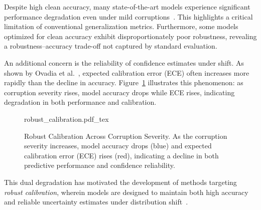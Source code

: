 Despite high clean accuracy, many state-of-the-art models experience significant performance degradation even under mild corruptions~\cite{hendrycks2019benchmarking}. This highlights a critical limitation of conventional generalization metrics. Furthermore, some models optimized for clean accuracy exhibit disproportionately poor robustness, revealing a robustness–accuracy trade-off not captured by standard evaluation.

An additional concern is the reliability of confidence estimates under shift. As shown by Ovadia et al.~\cite{ovadia2019can}, expected calibration error (ECE) often increases more rapidly than the decline in accuracy. Figure~\ref{fig:robust_calibration} illustrates this phenomenon: as corruption severity rises, model accuracy drops while ECE rises, indicating degradation in both performance and calibration.

\begin{figure}[h!]
	\centering
        \def\svgwidth{300pt}
 	{robust_calibration.pdf_tex} 	  	 	
	\caption[Robust Calibration Across Corruption Severity]{Robust Calibration Across Corruption Severity. As the corruption severity increases, model accuracy drops (blue) and expected calibration error (ECE) rises (red), indicating a decline in both predictive performance and confidence reliability.}
	\label{fig:robust_calibration}
\end{figure}

This dual degradation has motivated the development of methods targeting \textit{robust calibration}, wherein models are designed to maintain both high accuracy and reliable uncertainty estimates under distribution shift~\cite{ashukha2020pitfalls}.